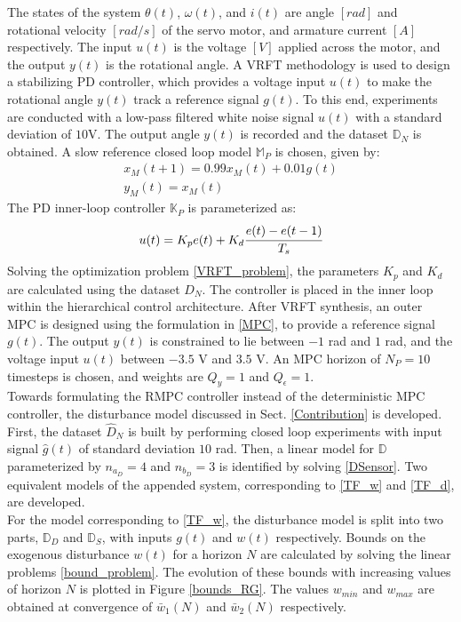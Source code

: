 \documentclass[letterpaper, 10 pt, conference]{ieeeconf}  %
\begin{document}
	\normalsize
	The states of the system $\theta(t)$, $\omega(t)$, and $i(t)$ are angle $[rad]$ and rotational velocity $[rad/s]$ of the servo motor, and armature current $[A]$ respectively. The input $u(t)$ is the voltage $[V]$ applied across the motor, and the output $y(t)$ is the rotational angle. 
	A VRFT methodology is used to design a stabilizing PD controller, which provides a voltage input $u(t)$ to make the rotational angle $y(t)$ track a reference signal $g(t)$. To this end, experiments are conducted with a low-pass filtered white noise signal $u(t)$ with a standard deviation of $10$V. The output angle $y(t)$ is recorded and the dataset $\mathbb{D}_N$ is obtained. A slow reference closed loop model $\mathbb{M}_P$ is chosen, given by:
	\begin{equation*}
	\begin{matrix}
	x_M(t+1) = 0.99x_M(t) + 0.01g(t)\\
	y_M(t) = x_M(t)
	\end{matrix}
	\end{equation*}
	The PD inner-loop controller $\mathbb{K}_P$ is parameterized as:
	\begin{equation*}
	u(t) = K_pe(t) + K_d\cfrac{e(t)-e(t-1)}{T_s}
	\end{equation*} 
	Solving the optimization problem \eqref{VRFT_problem}, the parameters 
	$K_p$ and $K_d$ are calculated using the dataset $D_N$. The controller is placed in the inner loop within the hierarchical control architecture.
	After VRFT synthesis, an outer MPC is designed using the formulation in \eqref{MPC}, to provide a reference signal $g(t)$. The output $y(t)$ is constrained to lie between $-1$ rad and $1$ rad, and the voltage input $u(t)$ between $-3.5$ V and $3.5$ V. An MPC horizon of $N_P=10$ timesteps is chosen, and weights are $Q_y=1$ and $Q_{\epsilon}=1$. \\
	Towards formulating the RMPC controller instead of the deterministic MPC controller, the disturbance model discussed in Sect. \ref{Contribution} is developed. First, the dataset $\hat{D}_N$ is built by performing closed loop experiments with input signal $\hat{g}(t)$ of standard deviation $10$ rad. Then, a linear model for $\mathbb{D}$ parameterized by $n_{a_D} = 4$ and $n_{b_D} = 3$ is identified by solving \eqref{DSensor}. Two equivalent models of the appended system, corresponding to \eqref{TF_w} and \eqref{TF_d}, are developed.  \\ 
	\indent For the model corresponding to \eqref{TF_w}, the disturbance model is split into two parts, $\mathbb{D}_D$ and $\mathbb{D}_S$, with inputs $g(t)$ and $w(t)$ respectively. Bounds on the exogenous disturbance $w(t)$ for a horizon $N$ are calculated by solving the linear problems \eqref{bound_problem}. The evolution of these bounds with increasing values of horizon $N$ is plotted in Figure \ref{bounds_RG}.  The values $w_{min}$ and $w_{max}$ are obtained at convergence of  $\bar{w}_1(N)$ and $\bar{w}_2(N)$ respectively.
\end{document}
